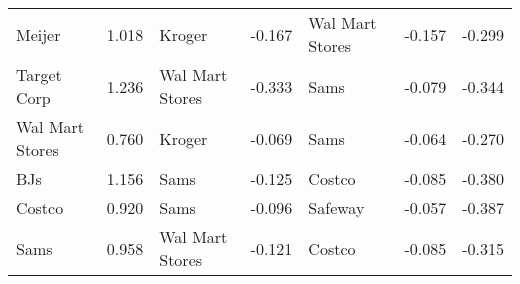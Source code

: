 \begin{table}[htbp]
\begin{tabular}{ll|ll|ll|r}
\textrm{ Meijer } & 1.018 &\textrm{ Kroger  } &-0.167 &\textrm{ Wal Mart Stores } &-0.157 & -0.299 \\ 
\textrm{ Target Corp } & 1.236 &\textrm{ Wal Mart Stores } &-0.333 &\textrm{ Sams } &-0.079 & -0.344 \\ 
\textrm{ Wal Mart Stores } & 0.760 &\textrm{ Kroger  } &-0.069 &\textrm{ Sams } &-0.064 & -0.270 \\ 
\textrm{ BJs } & 1.156 &\textrm{ Sams } &-0.125 &\textrm{ Costco } &-0.085 & -0.380 \\ 
\textrm{ Costco } & 0.920 &\textrm{ Sams } &-0.096 &\textrm{ Safeway  } &-0.057 & -0.387 \\ 
\textrm{ Sams } & 0.958 &\textrm{ Wal Mart Stores } &-0.121 &\textrm{ Costco } &-0.085 & -0.315 \\ 
\midrule\bottomrule\end{tabular}\end{table}